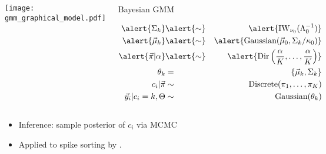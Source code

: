\documentclass{beamer}
\begin{document}
\begin{frame}{}
\begin{columns}[top]
\begin{center}
		\texttt{[image: gmm\_graphical\_model.pdf]}
\end{center}
\begin{block}{Bayesian GMM}

\begin{eqnarray*}
\alert{ \Sigma_k} & \alert{\sim} & \alert{\text{IW}_{\nu_0}(\Lambda_0^{-1})}\\
\alert{\vec{\mu}_k} & \alert{\sim} & \alert{\text{Gaussian}(\vec{\mu}_0,\Sigma_k/\kappa_0)} \\
\alert{\vec{\pi}|\alpha} & \alert{\sim} & \alert{\text{Dir}\left(\frac{\alpha}{K},\ldots,\frac{\alpha}{K}\right)} \\
\theta_k &=& \{\vec \mu_k,\Sigma_k\} \\
c_i | \vec \pi &\sim& \mbox{Discrete}(\pi_1, \ldots, \pi_K) \\
\vec y_i | c_i=k, \Theta &\sim& \mbox{Gaussian}(\theta_k) \\
\end{eqnarray*}

\end{block}
\end{columns}
\begin{block}{}
\begin{itemize}
	\item{Inference: sample posterior of $c_i$ via MCMC}
	\item{Applied to spike sorting by \cite{Lewicki1994}.}
\end{itemize}
\end{block}
\end{frame}
\end{document}
